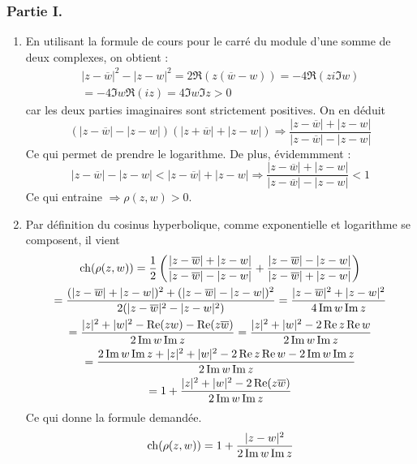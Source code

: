 \subsubsection*{Partie I.}
\begin{enumerate}
 \item En utilisant la formule de cours pour le carré du module d'une somme de deux complexes, on obtient :
\begin{multline*}
 |z-\overline{w}|^2 -|z-w|^2 = 2\Re\left( z(\overline{w}-w)\right)
= -4 \Re(zi\Im w)\\ = -4\Im w\Re(iz)=4\Im w \Im z >0 
\end{multline*}
car les deux parties imaginaires sont strictement positives. On en déduit 
\begin{displaymath}
 (|z-\overline{w}|-|z-w|)(|z+\overline{w}|+|z-w|)
\Rightarrow \dfrac{|z-\overline{w}|+|z-w|}{|z-\overline{w}|-|z-w|}
\end{displaymath}
Ce qui permet de prendre le logarithme. De plus, évidemmment :
\begin{displaymath}
 |z-\overline{w}|-|z-w| < |z-\overline{w}|+|z-w| \Rightarrow \dfrac{|z-\overline{w}|+|z-w|}{|z-\overline{w}|-|z-w|}<1
\end{displaymath}
Ce qui entraine $\Rightarrow \rho(z,w)>0$.
\item Par définition du cosinus hyperbolique, comme exponentielle et logarithme se composent, il vient
\begin{multline*}
 \operatorname{ch}(\rho(z,w))=\dfrac{1}{2}\left( \dfrac{|z-\overline{w}|+|z-w|}{|z-\overline{w}|-|z-w|} +\dfrac{|z-\overline{w}|-|z-w|}{|z-\overline{w}|+|z-w|}\right) \\
= \dfrac{(|z-\overline{w}|+|z-w|)^2+(|z-\overline{w}|-|z-w|)^2}{2(|z-\overline{w}|^2-|z-w|^2)}
= \dfrac{|z-\overline{w}|^2+|z-w|^2}{4\operatorname{Im} w \operatorname{Im} z}\\
= \dfrac{|z|^2+|w|^2 -\operatorname{Re} (zw) -\operatorname{Re}(z\overline{w})}{2\operatorname{Im} w \operatorname{Im} z}
= \dfrac{|z|^2+|w|^2 -2\operatorname{Re} z \operatorname{Re} w }{2\operatorname{Im} w \operatorname{Im} z} \\
= \dfrac{2\operatorname{Im} w \operatorname{Im} z+|z|^2+|w|^2 -2\operatorname{Re} z \operatorname{Re} w -2\operatorname{Im} w \operatorname{Im} z}{2\operatorname{Im} w \operatorname{Im} z}\\
= 1 + \dfrac{|z|^2+|w|^2 -2\operatorname{Re} (z\overline{w})}{2\operatorname{Im} w \operatorname{Im} z}
\end{multline*}
Ce qui donne la formule demandée.
\begin{displaymath}
 \operatorname{ch}(\rho(z,w))= 1 + \dfrac{|z-w|^2}{2\operatorname{Im} w \operatorname{Im} z}
\end{displaymath}


\end{enumerate}
